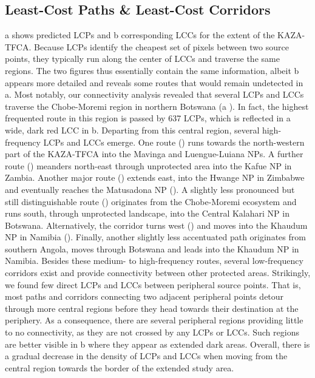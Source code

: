 \documentclass[abstract=on,10pt,a4paper,bibliography=totocnumbered]{scrartcl}
\newcommand*\circled[1]{\tikz[baseline=(char.base)]{
            \node[shape=circle,draw,inner sep=1pt] (char) {#1};}}
\begin{document}
\subsection{Least-Cost Paths \& Least-Cost Corridors}
a shows predicted LCPs and b corresponding LCCs
for the extent of the KAZA-TFCA. Because LCPs identify the cheapest set of
pixels between two source points, they typically run along the center of LCCs
and traverse the same regions. The two figures thus essentially contain the same
information, albeit b appears more detailed and reveals some
routes that would remain undetected in a. Most notably, our
connectivity analysis revealed that several LCPs and LCCs traverse the
Chobe-Moremi region in northern Botswana (a \circled{1}). In
fact, the highest frequented route in this region is passed by 637 LCPs, which
is reflected in a wide, dark red LCC in b. Departing from this
central region, several high-frequency LCPs and LCCs emerge. One route
(\circled{2}) runs towards the north-western part of the KAZA-TFCA into the
Mavinga and Luengue-Luiana NPs. A further route (\circled{3}) meanders
north-east through unprotected area into the Kafue NP in Zambia. Another major
route (\circled{4}) extends east, into the Hwange NP in Zimbabwe and eventually
reaches the Matusadona NP (\circled{5}). A slightly less pronounced but still
distinguishable route (\circled{6}) originates from the Chobe-Moremi ecosystem
and runs south, through unprotected landscape, into the Central Kalahari NP in
Botswana. Alternatively, the corridor turns west (\circled{8}) and moves into
the Khaudum NP in Namibia (\circled{7}). Finally, another slightly less
accentuated path originates from southern Angola, moves through Botswana and
leads into the Khaudum NP in Namibia. Besides these medium- to high-frequency
routes, several low-frequency corridors exist and provide connectivity between
other protected areas. Strikingly, we found few direct LCPs and LCCs between
peripheral source points. That is, most paths and corridors connecting two
adjacent peripheral points detour through more central regions before they head
towards their destination at the periphery. As a consequence, there are several
peripheral regions providing little to no connectivity, as they are not crossed
by any LCPs or LCCs. Such regions are better visible in b where
they appear as extended dark areas. Overall, there is a gradual decrease in the
density of LCPs and LCCs when moving from the central region towards the border
of the extended study area.
\end{document}
